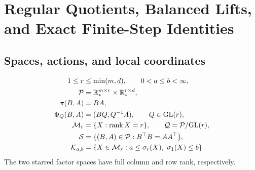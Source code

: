\section{Regular Quotients, Balanced Lifts, and Exact Finite-Step Identities}
\label{app:geometry}
\subsection{Spaces, actions, and local coordinates}
\begin{definition}
\begin{align}
1\leq r&\leq\min(m,d),\qquad 0<a\leq b<\infty,\\
\mathcal P&=\mathbb R_*^{m\times r}\times\mathbb R_*^{r\times d},\\
\pi(B,A)&=BA,\\
\Phi_Q(B,A)&=(BQ,Q^{-1}A),\qquad Q\in{\rm GL}(r),\\
\mathcal M_r&=\{X:\operatorname{rank} X=r\},\qquad
\mathcal Q=\mathcal P/{\rm GL}(r),\\
\mathcal S&=\{(B,A)\in\mathcal P:B^\top B=AA^\top\},\\
\mathcal K_{a,b}&=\{X\in\mathcal M_r:a\leq\sigma_r(X),\
\sigma_1(X)\leq b\}.
\label{eq:rigid-domain}
\end{align}
The two starred factor spaces have full column and row rank, respectively.
\end{definition}

